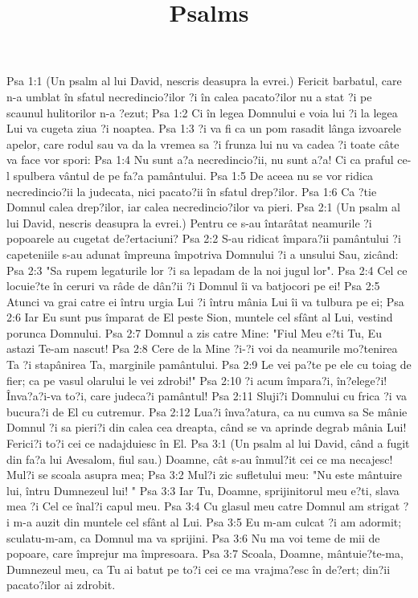 

\title{Psalms}

Psa 1:1  (Un psalm al lui David, nescris deasupra la evrei.) Fericit barbatul, care n-a umblat în sfatul necredincio?ilor ?i în calea pacato?ilor nu a stat ?i pe scaunul hulitorilor n-a ?ezut;
Psa 1:2  Ci în legea Domnului e voia lui ?i la legea Lui va cugeta ziua ?i noaptea.
Psa 1:3  ?i va fi ca un pom rasadit lânga izvoarele apelor, care rodul sau va da la vremea sa ?i frunza lui nu va cadea ?i toate câte va face vor spori:
Psa 1:4  Nu sunt a?a necredincio?ii, nu sunt a?a! Ci ca praful ce-l spulbera vântul de pe fa?a pamântului.
Psa 1:5  De aceea nu se vor ridica necredincio?ii la judecata, nici pacato?ii în sfatul drep?ilor.
Psa 1:6  Ca ?tie Domnul calea drep?ilor, iar calea necredincio?ilor va pieri.
Psa 2:1  (Un psalm al lui David, nescris deasupra la evrei.) Pentru ce s-au întarâtat neamurile ?i popoarele au cugetat de?ertaciuni?
Psa 2:2  S-au ridicat împara?ii pamântului ?i capeteniile s-au adunat împreuna împotriva Domnului ?i a unsului Sau, zicând:
Psa 2:3  "Sa rupem legaturile lor ?i sa lepadam de la noi jugul lor".
Psa 2:4  Cel ce locuie?te în ceruri va râde de dân?ii ?i Domnul îi va batjocori pe ei!
Psa 2:5  Atunci va grai catre ei întru urgia Lui ?i întru mânia Lui îi va tulbura pe ei;
Psa 2:6  Iar Eu sunt pus împarat de El peste Sion, muntele cel sfânt al Lui, vestind porunca Domnului.
Psa 2:7  Domnul a zis catre Mine: "Fiul Meu e?ti Tu, Eu astazi Te-am nascut!
Psa 2:8  Cere de la Mine ?i-?i voi da neamurile mo?tenirea Ta ?i stapânirea Ta, marginile pamântului.
Psa 2:9  Le vei pa?te pe ele cu toiag de fier; ca pe vasul olarului le vei zdrobi!"
Psa 2:10  ?i acum împara?i, în?elege?i! Înva?a?i-va to?i, care judeca?i pamântul!
Psa 2:11  Sluji?i Domnului cu frica ?i va bucura?i de El cu cutremur.
Psa 2:12  Lua?i înva?atura, ca nu cumva sa Se mânie Domnul ?i sa pieri?i din calea cea dreapta, când se va aprinde degrab mânia Lui! Ferici?i to?i cei ce nadajduiesc în El.
Psa 3:1  (Un psalm al lui David, când a fugit din fa?a lui Avesalom, fiul sau.) Doamne, cât s-au înmul?it cei ce ma necajesc! Mul?i se scoala asupra mea;
Psa 3:2  Mul?i zic sufletului meu: "Nu este mântuire lui, întru Dumnezeul lui! "
Psa 3:3  Iar Tu, Doamne, sprijinitorul meu e?ti, slava mea ?i Cel ce înal?i capul meu.
Psa 3:4  Cu glasul meu catre Domnul am strigat ?i m-a auzit din muntele cel sfânt al Lui.
Psa 3:5  Eu m-am culcat ?i am adormit; sculatu-m-am, ca Domnul ma va sprijini.
Psa 3:6  Nu ma voi teme de mii de popoare, care împrejur ma împresoara.
Psa 3:7  Scoala, Doamne, mântuie?te-ma, Dumnezeul meu, ca Tu ai batut pe to?i cei ce ma vrajma?esc în de?ert; din?ii pacato?ilor ai zdrobit.
